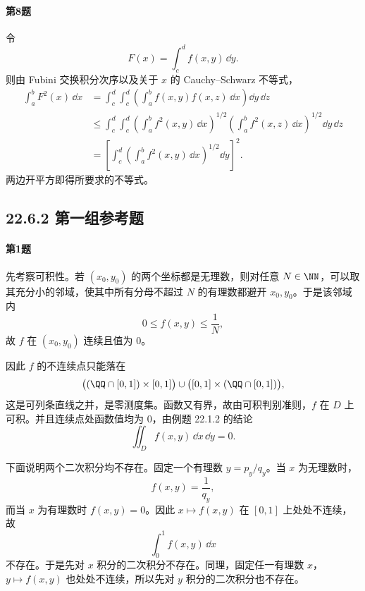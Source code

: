 \paragraph{第8题}
\begin{xsolution}
令
\[
 F(x)=\int_c^df(x,y)\,\dd y.
\]
则由 Fubini 交换积分次序以及关于 $x$ 的 Cauchy--Schwarz 不等式，
\begin{align*}
 \int_a^bF^2(x)\,\dd x
 &=\int_c^d\int_c^d
 \left(\int_a^bf(x,y)f(x,z)\,\dd x\right)\dd y\,\dd z\\
 &\le\int_c^d\int_c^d
 \left(\int_a^bf^2(x,y)\,\dd x\right)^{1/2}
 \left(\int_a^bf^2(x,z)\,\dd x\right)^{1/2}
 \dd y\,\dd z\\
 &=\left[
 \int_c^d\left(\int_a^bf^2(x,y)\,\dd x\right)^{1/2}\dd y
 \right]^2.
\end{align*}
两边开平方即得所要求的不等式。
\end{xsolution}

\subsection*{22.6.2 第一组参考题}

\paragraph{第1题}
\begin{xsolution}
先考察可积性。若 $(x_0,y_0)$ 的两个坐标都是无理数，则对任意 $N\in\NN$，可以取其充分小的邻域，使其中所有分母不超过 $N$ 的有理数都避开 $x_0,y_0$。于是该邻域内
\[
  0\le f(x,y)\le\frac1N,
\]
故 $f$ 在 $(x_0,y_0)$ 连续且值为 $0$。

因此 $f$ 的不连续点只能落在
\[
  \bigl((\QQ\cap[0,1])\times[0,1]\bigr)
  \cup
  \bigl([0,1]\times(\QQ\cap[0,1])\bigr),
\]
这是可列条直线之并，是零测度集。函数又有界，故由可积判别准则，$f$ 在 $D$ 上可积。并且连续点处函数值均为 $0$，由例题 22.1.2 的结论
\[
  \iint_Df(x,y)\,\dd x\,\dd y=0.
\]

下面说明两个二次积分均不存在。固定一个有理数 $y=p_y/q_y$。当 $x$ 为无理数时，
\[
  f(x,y)=\frac1{q_y},
\]
而当 $x$ 为有理数时 $f(x,y)=0$。因此 $x\mapsto f(x,y)$ 在 $[0,1]$ 上处处不连续，故
\[
  \int_0^1f(x,y)\,\dd x
\]
不存在。于是先对 $x$ 积分的二次积分不存在。同理，固定任一有理数 $x$，$y\mapsto f(x,y)$ 也处处不连续，所以先对 $y$ 积分的二次积分也不存在。
\end{xsolution}

